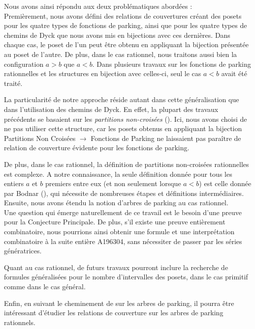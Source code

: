 Nous avons ainsi répondu aux deux problématiques abordées :\\

Premièrement, nous avons défini des relations de couvertures créant des
posets pour les quatre types de fonctions de parking, ainsi que pour les
quatre types de chemins de Dyck que nous avons mis en bijections avec ces
dernières.
Dans chaque cas, le poset de l'un peut être obtenu en appliquant la
bijection présentée au poset de l'autre.
De plus, dans le cas rationnel, nous traitons aussi bien la configuration
$a > b$ que $a < b$.
Dans plusieurs travaux sur les fonctions de parking rationnelles
et les structures en bijection avec celles-ci, seul le cas $a < b$ avait
été traité.

La particularité de notre approche réside autant dans cette généralisation
que dans l'utilisation des chemins de Dyck.
En effet, la plupart des travaux précédents se basaient sur les
\emph{partitions non-croisées} (\cite{ref4, ref5, ref8, ref9}).
Ici, nous avons choisi de ne pas utiliser cette structure, car les posets
obtenus en appliquant la bijection Partitions Non Croisées $\to$ Fonctions
de Parking ne laissaient pas paraître de relation de couverture évidente
pour les fonctions de parking.

De plus, dans le cas rationnel, la définition de partitions non-croisées
rationnelles est complexe.
A notre connaissance, la seule définition donnée pour tous les entiers $a$
et $b$ premiers entre eux (et non seulement lorsque $a < b$) est celle donnée
par Bodnar (\cite{ref8}), qui nécessite de nombreuses étapes et définitions
intermédiaires.\\

Ensuite, nous avons étendu la notion d'arbres de parking au cas rationnel.\\

Une question qui émerge naturellement de ce travail est le besoin d'une
preuve pour la Conjecture Principale.
De plus, s'il existe une preuve entièrement combinatoire, nous pourrions
ainsi obtenir une formule et une interprétation combinatoire à la suite
entière A196304, sans nécessiter de passer par les séries génératrices.

Quant au cas rationnel, de futurs travaux pourront inclure la recherche de
formules généralisées pour le nombre d'intervalles des posets, dans le cas
primitif comme dans le cas général.

Enfin, en suivant le cheminement de \cite{ref9} sur les arbres de parking,
il pourra être intéressant d'étudier les relations de couverture sur les
arbres de parking rationnels.